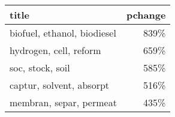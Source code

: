 \begin{tabular}{p{1.2cm}r}
\toprule
                       title &  pchange \\
\midrule
 biofuel, ethanol, biodiesel &     839\% \\
      hydrogen, cell, reform &     659\% \\
            soc, stock, soil &     585\% \\
    captur, solvent, absorpt &     516\% \\
     membran, separ, permeat &     435\% \\
\bottomrule
\end{tabular}
